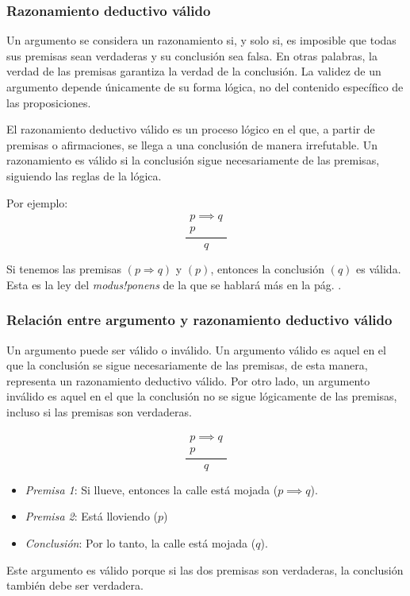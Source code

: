 \subsubsection{Razonamiento deductivo válido}
\vspace{1em} 
\begin{fmd-definition}
	Un argumento se considera un \gls{razonamiento} si, y solo si, es imposible que todas sus premisas sean verdaderas y su conclusión sea falsa. En otras palabras, la verdad de las premisas garantiza la verdad de la conclusión. La validez de un argumento depende únicamente de su forma lógica, no del contenido específico de las proposiciones.
\end{fmd-definition}

El razonamiento deductivo válido es un proceso lógico en el que, a partir de premisas o afirmaciones, se llega a una conclusión de manera irrefutable. Un razonamiento es válido si la conclusión sigue necesariamente de las premisas, siguiendo las reglas de la lógica.

Por ejemplo:
\[ \frac{\begin{array}{l}
		p \implies  q\\
		p
\end{array}}{q} \]

Si tenemos las premisas $(p \Rightarrow q)$ y $(p)$, entonces la conclusión $(q)$ es válida. Esta es la ley del \textit{modus!ponens} de la que se hablará más en la pág. \pageref{def:ponens}.

\subsubsection{Relación entre argumento y razonamiento deductivo válido}

Un argumento puede ser válido o inválido. Un argumento válido es aquel en el que la conclusión se sigue necesariamente de las premisas, de esta manera, representa un razonamiento deductivo válido. Por otro lado, un argumento inválido es aquel en el que la conclusión no se sigue lógicamente de las premisas, incluso si las premisas son verdaderas.


\begin{fmd-example} 
	\[ \frac{\begin{array}{l}
			p \implies  q\\
			p
	\end{array}}{q} \]
	\begin{itemize}
		\item \textit{Premisa 1}: Si llueve, entonces la calle está mojada (\( p \implies q \)).
		\item \textit{Premisa 2}: Está lloviendo ($p$)
		\item \textit{Conclusión}: Por lo tanto, la calle está mojada ($q$).
	\end{itemize}
	Este argumento es válido porque si las dos premisas son verdaderas, la conclusión también debe ser verdadera.
\end{fmd-example}

